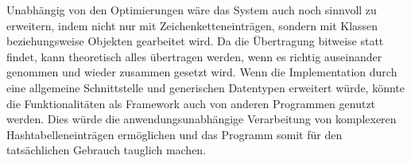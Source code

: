 \documentclass{scrreprt}
\begin{document}
Unabhängig von den Optimierungen wäre das System auch noch sinnvoll zu erweitern, indem nicht nur mit Zeichenketteneinträgen, sondern mit Klassen beziehungsweise Objekten gearbeitet wird. Da die Übertragung bitweise statt findet, kann theoretisch alles übertragen werden, wenn es richtig auseinander genommen und wieder zusammen gesetzt wird. Wenn die Implementation durch eine allgemeine Schnittstelle und generischen Datentypen erweitert würde, könnte die Funktionalitäten als Framework auch von anderen Programmen genutzt werden. Dies würde die anwendungsunabhängige Verarbeitung von komplexeren Hashtabelleneinträgen ermöglichen und das Programm somit für den tatsächlichen Gebrauch tauglich machen.

\nocite{*}
\printbibliography
{}

\listoffigures
{}
 
\listoftables
{}
\end{document}
